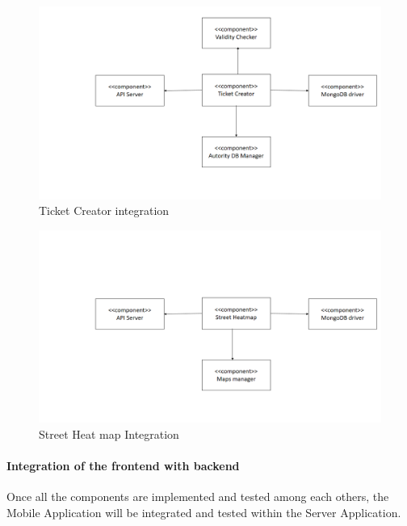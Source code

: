 \begin{figure}[H]
\centering
\includegraphics[width=\textwidth]{Images/TicketCreatorIntegration.png}
\caption{\label{fig:TicketCreatorIntegration} Ticket Creator integration}
\end{figure}

\begin{figure}[H]
\centering
\includegraphics[width=\textwidth]{Images/StreetHeatmapIntegration.png}
\caption{\label{fig:StreetHeatmapIntegration}Street Heat map Integration}
\end{figure}


\paragraph{Integration of the frontend with backend}
Once all the components are implemented and tested among each others, the Mobile Application will be integrated and tested within the Server Application. \\

